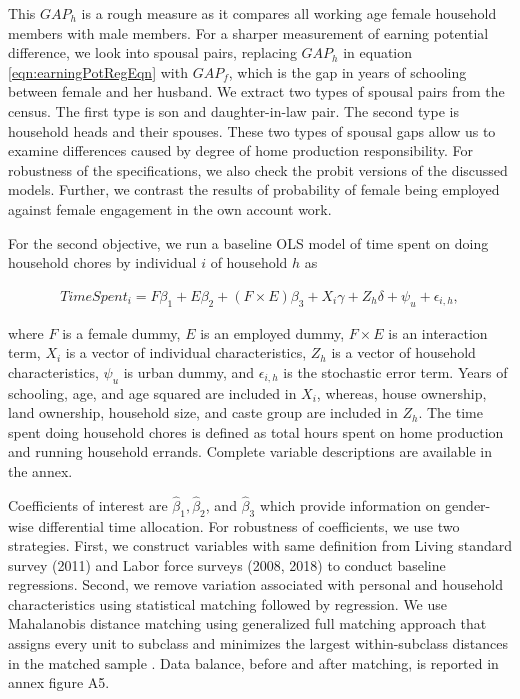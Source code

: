 This $GAP_{h}$ is a rough measure as it compares all working age female household members with male members. For a sharper measurement of earning potential difference, we look into spousal pairs, replacing $GAP_{h}$ in equation \ref{eqn:earningPotRegEqn} with $GAP_{f}$, which is the gap in years of schooling between female and her husband. We extract two types of spousal pairs from the census. The first type is son and daughter-in-law pair. The second type is household heads and their spouses. These two types of spousal gaps allow us to examine differences caused by degree of home production responsibility. For robustness of the specifications, we also check the probit versions of the discussed models. Further, we contrast the results of probability of female being employed against female engagement in the own account work.\par 

For the second objective, we run a baseline OLS model of time spent on doing household chores by individual $i$ of household $h$ as
\begin{linenomath*}\begin{align}
	TimeSpent_{i} = F\beta_{1} + E\beta_{2} + (F\times E)\beta_{3} + X_{i}\gamma+ Z_{h}\delta+ \psi_{u} + \epsilon_{i,h},
	\end{align}\end{linenomath*} 
where $F$ is a female dummy, $E$ is an employed dummy, $F\times E$ is an interaction term, $X_{i}$ is a vector of individual characteristics, $Z_{h}$ is a vector of household characteristics, $\psi_{u}$ is urban dummy, and $\epsilon_{i,h}$ is the stochastic error term. Years of schooling, age, and age squared are included in $X_{i}$, whereas, house ownership, land ownership, household size, and caste group are included in $Z_{h}$.  The time spent doing household chores is defined as total hours spent on home production and running household errands. Complete variable descriptions are available in the annex.\par

Coefficients of interest are $\hat{\beta}_{1}, \hat{\beta}_{2}$, and $\hat{\beta}_{3}$ which provide information on gender-wise differential time allocation. For robustness of coefficients, we use two strategies. First, we construct variables with same definition from Living standard survey (2011) and Labor force surveys (2008, 2018) to conduct baseline regressions. Second, we remove variation associated with personal and household characteristics using statistical matching followed by regression. We use Mahalanobis distance matching using generalized full matching approach that assigns every  unit to subclass and minimizes the largest within-subclass distances in the matched sample \parencite{Savje2021}. Data balance, before and after matching, is reported in annex figure A5.\par 


